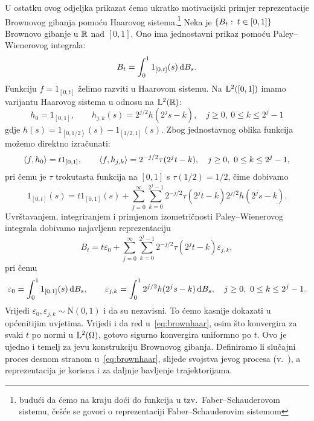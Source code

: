 \documentclass[main.tex]{subfiles}
\begin{document}
U ostatku ovog odjeljka prikazat ćemo ukratko motivacijski primjer reprezentacije Brownovog gibanja
pomoću Haarovog sistema.\footnote{budući da ćemo na kraju doći do funkcija u tzv.\ Faber--Schauderovom sistemu, češće se govori o reprezentaciji Faber--Schauderovim sistemom}
Neka je \( \left\{ B_t \, \colon \, t \in \left[ 0,1 \right] \right\} \) Brownovo gibanje u \( \mathbb{R} \) nad
\( \left[ 0,1 \right] \). Ono ima jednostavni prikaz
pomoću Paley--Wienerovog integrala:
\begin{equation} \label{eq:bmwint}
	B_t = \int_0^1 1_{\left[ 0,t \right]}(s) \,\mathrm d B_s.
\end{equation}
Funkciju \( f = 1_{\left[ 0,t \right]} \) želimo razviti u Haarovom sistemu. Na \( \mathrm{L}^2(\left[0,1  \right]) \)
imamo varijantu Haarovog sistema u odnosu na \( \mathrm{L}^2(\mathbb{R}) \):
\begin{equation}
	h_0 = 1_{\left[0,1 \right]}, \qquad h_{j,k}(s) = 2^{j/2}h(2^js - k), \quad j \ge 0, \ 0 \le k \le 2^j-1
\end{equation}
gdje \( h(s) = 1_{\left[ 0, 1/2 \right\rangle}(s) - 1_{\left[ 1/2,1 \right]}(s) \). Zbog jednostavnog
oblika funkcija možemo direktno izračunati:
\begin{equation}
	\left\langle {f}, {h_0} \right\rangle = t1_{\left[ 0,1 \right]}, \qquad
	\left\langle {f}, {h_{j,k}} \right\rangle = 2^{-j/2} \tau(2^jt - k), \quad j \ge 0, \ 0 \le k \le 2^j-1,
\end{equation}
pri čemu je \( \tau \) trokutasta funkcija na \( \left[ 0,1 \right] \) s \( \tau(1/2)=1/2 \), čime
dobivamo
\begin{equation}
	1_{\left[ 0,t \right]}(s) = t1_{\left[ 0,1 \right]}(s) +
	\sum_{j=0}^\infty \sum_{k=0}^{2^j-1}
	2^{-j/2} \tau(2^jt - k)2^{j/2} h(2^js - k).
\end{equation}
Uvrštavanjem, integriranjem i primjenom izometričnosti Paley--Wienerovog integrala dobivamo na\-jav\-lje\-nu reprezentaciju
\begin{equation} \label{eq:brownhaar}
	B_t = t\varepsilon_0 + \sum_{j=0}^\infty\sum_{k=0}^{2^j-1} 2^{-j/2}\tau(2^jt - k) \varepsilon_{j,k},
\end{equation}
pri čemu
\begin{equation}
	\varepsilon_0 = \int_0^1 1_{\left[ 0,1 \right]}(s) \,\mathrm d B_s, \qquad
	\varepsilon_{j,k} = \int_0^1 2^{j/2} h(2^js - k) \,\mathrm d B_s, \quad j \ge 0, \ 0 \le k \le 2^j-1.
\end{equation}
Vrijedi \( \varepsilon_0, \varepsilon_{j,k} \sim \mathrm N(0,1) \) i da su nezavisni.
To ćemo kasnije dokazati u općenitijim uvjetima.
Vrijedi i da red u~\eqref{eq:brownhaar}, osim što konvergira za svaki \( t \) po
normi u \( \mathrm{L}^2(\Omega) \), gotovo sigurno konvergira uniformno po \( t \).
Ovo je ujedno i temelj za \levy jevu konstrukciju Brownovog gibanja. Definiramo li
slučajni proces desnom stranom u~\eqref{eq:brownhaar}, slijede
svojstva \levy jevog procesa (v.~\cite{diez}), a reprezentacija je korisna
i za daljnje bavljenje trajektorijama.
\end{document}
